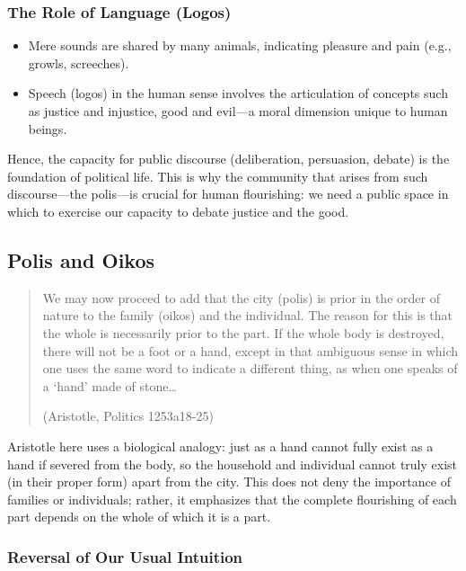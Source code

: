                 \subsubsection{The Role of Language (Logos)}
    
                    \begin{itemize}
                        \item Mere sounds are shared by many animals, indicating pleasure and pain (e.g., growls, screeches).
                        \item Speech (logos) in the human sense involves the articulation of concepts such as justice and injustice, good and evil—a moral dimension unique to human beings.
                    \end{itemize}
    
                    Hence, the capacity for public discourse (deliberation, persuasion, debate) is the foundation of political life. This is why the community that arises from such discourse—the polis—is crucial for human flourishing: we need a public space in which to exercise our capacity to debate justice and the good.

            \subsection{Polis and Oikos}

                \begin{quote}
                    We may now proceed to add that the city (polis) is prior in the order of nature to the family (oikos) and the individual. The reason for this is that the whole is necessarily prior to the part. If the whole body is destroyed, there will not be a foot or a hand, except in that ambiguous sense in which one uses the same word to indicate a different thing, as when one speaks of a ‘hand’ made of stone…

                    (Aristotle, Politics 1253a18-25)
                \end{quote}

                    Aristotle here uses a biological analogy: just as a hand cannot fully exist as a hand if severed from the body, so the household and individual cannot truly exist (in their proper form) apart from the city. This does not deny the importance of families or individuals; rather, it emphasizes that the complete flourishing of each part depends on the whole of which it is a part.

                    \subsubsection{Reversal of Our Usual Intuition}

